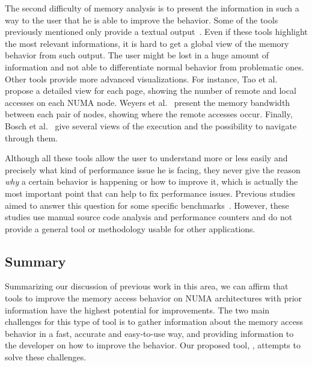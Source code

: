 The second difficulty of memory analysis is to present the information in such a
 way to the user that he is able to improve the behavior. Some of the tools previously mentioned only provide
a textual output~\cite{Lachaize12MemProf,McCurdy2010}. Even if these tools highlight the most relevant informations, it is hard to get a global
view of the memory behavior from such output. The user might be lost in a
huge amount of information and not able to differentiate normal behavior from
problematic ones. Other tools provide more advanced visualizations. For
instance, Tao et al.~\cite{Tao01Visualizing} propose a detailed view for each
page, showing the number of remote and local accesses on each NUMA node. Weyers et
al.~\cite{Weyers14Visualization} present the memory bandwidth between each pair of nodes,
showing where the remote accesses occur. Finally, Bosch et al.~\cite{Bosch00Rivet} give several views of the execution and the possibility to
navigate through them.

Although all these tools allow the user to understand more or less easily and
precisely what kind of performance issue he is facing, they never give the
reason \emph{why} a certain behavior is happening or how to improve it, which is actually the most important point that can help to fix performance issues.
Previous studies aimed to answer this question for some specific
benchmarks~\cite{Majo13(Mis)understanding,Jiang14Understanding}.
However, these studies use manual source code analysis and performance counters and do not provide a general tool or methodology usable for other applications.

\subsection{Summary}

Summarizing our discussion of previous work in this area, we can affirm that tools to improve the memory access behavior on NUMA architectures with prior information have the highest potential for improvements.
The two main challenges for this type of tool is to gather information about the memory access behavior in a fast, accurate and easy-to-use way, and providing information to the developer on how to improve the behavior.
Our proposed tool, \TABARNAC, attempts to solve these challenges.



